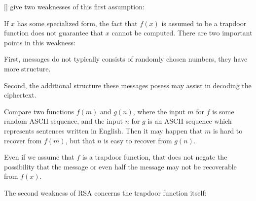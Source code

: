 [\cite{Gol19820}] give two weaknesses of this first assumption:


\begin{rem}
 If $x$ has some specialized form, the fact that $f(x)$ is assumed to be a trapdoor function does not guarantee that $x$ cannot be computed. There are two important points in this weakness:
\end{rem}

\begin{case}
First, messages do not typically consists of randomly chosen numbers, they have more structure.
\end{case}

\begin{case}
Second, the additional structure these messages posess may assist in decoding the ciphertext.
\end{case} 

\begin{exmp}
Compare two functions $f(m)$ and $g(n)$, where the input $m$ for $f$ is some random ASCII sequence, and the input $n$ for $g$ is an ASCII sequence which represents sentences written in English. Then it may happen that $m$ is hard to recover from $f(m)$, but that $n$ is easy to recover from $g(n)$.
\end{exmp}

\begin{rem}
Even if we assume that $f$ is a trapdoor function, that does not negate the possibility that the message or even half the message may not be recoverable from $f(x)$. 
\end{rem}


The second weakness of RSA concerns the trapdoor function itself: 

